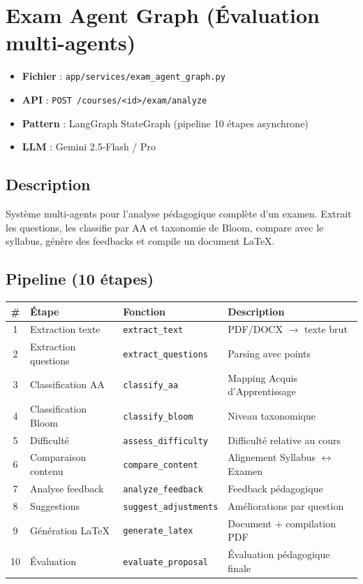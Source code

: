 \documentclass[12pt,a4paper]{article}
\begin{document}
\section{Exam Agent Graph (Évaluation multi-agents)}

\begin{itemize}[leftmargin=*]
    \item \textbf{Fichier} : \texttt{app/services/exam\_agent\_graph.py}
    \item \textbf{API} : \texttt{POST /courses/<id>/exam/analyze}
    \item \textbf{Pattern} : LangGraph StateGraph (pipeline 10 étapes asynchrone)
    \item \textbf{LLM} : Gemini 2.5-Flash / Pro
\end{itemize}

\subsection{Description}
Système multi-agents pour l'analyse pédagogique complète d'un examen. Extrait les questions, les classifie par AA et taxonomie de Bloom, compare avec le syllabus, génère des feedbacks et compile un document \LaTeX.

\subsection{Pipeline (10 étapes)}

\begin{longtable}{@{}clp{4cm}p{6cm}@{}}
\toprule
\textbf{\#} & \textbf{Étape} & \textbf{Fonction} & \textbf{Description} \\
\midrule
\endhead
1 & Extraction texte & \texttt{extract\_text} & PDF/DOCX $\rightarrow$ texte brut \\
2 & Extraction questions & \texttt{extract\_questions} & Parsing avec points \\
3 & Classification AA & \texttt{classify\_aa} & Mapping Acquis d'Apprentissage \\
4 & Classification Bloom & \texttt{classify\_bloom} & Niveau taxonomique \\
5 & Difficulté & \texttt{assess\_difficulty} & Difficulté relative au cours \\
6 & Comparaison contenu & \texttt{compare\_content} & Alignement Syllabus $\leftrightarrow$ Examen \\
7 & Analyse feedback & \texttt{analyze\_feedback} & Feedback pédagogique \\
8 & Suggestions & \texttt{suggest\_adjustments} & Améliorations par question \\
9 & Génération \LaTeX & \texttt{generate\_latex} & Document + compilation PDF \\
10 & Évaluation & \texttt{evaluate\_proposal} & Évaluation pédagogique finale \\
\bottomrule
\end{longtable}
\end{document}
